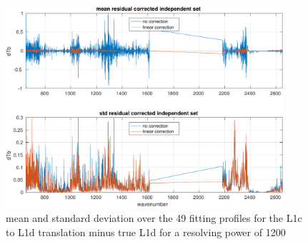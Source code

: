 \documentclass[11pt]{article}
\begin{document}



\begin{figure} %
  \centering
  \includegraphics[height=7.5cm]{figures/L1d_corr_1200.pdf}
  \caption{mean and standard deviation over the 49 fitting profiles
    for the L1c to L1d translation minus true L1d for a resolving
    power of 1200}
  \label{L1d1200}
\end{figure}
\end{document}
